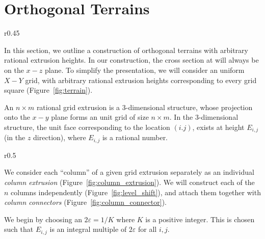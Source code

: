 \section{Orthogonal Terrains}
\label{sec:orthogonal_terrains}

\graphicspath{{./notebooks/}}%
\begin{wrapfigure}[7]{r}{0.45\textwidth}
    \vspace{-2.7em}
    \def\svgwidth{0.45\textwidth}
    
    \caption{Example orthogonal terrain.}
    \label{fig:terrain}
    \vspace{-1.2em}
\end{wrapfigure}
In this section, we outline a construction of orthogonal terrains with arbitrary rational extrusion heights.
In our construction, the cross section at will always be on the $x-z$ plane.
To simplify the presentation, we will consider an uniform $X-Y$ grid,
with arbitrary rational extrusion heights corresponding to every grid square (Figure~\ref{fig:terrain}).
\begin{definition}
An $n\times m$ rational grid extrusion is a 3-dimensional structure,
whose projection onto the $x-y$ plane forms an unit grid of size $n\times m$.
In the 3-dimensional structure, the unit face corresponding to the location $(i.j)$,
exists at height $E_{i,j}$ (in the $z$ direction), where $E_{i,j}$ is a rational number.
\end{definition}

\graphicspath{{./figures/}}
\begin{wrapfigure}[7]{r}{0.5\textwidth}
    \vspace{-2.5em}
    \def\svgwidth{0.5\textwidth}
    \caption{Column extrusion with heights $\left\{ 0,1,3,1,2,0\right\}$.}
    \label{fig:column_extrusion}
    \vspace{-0.8em}
\end{wrapfigure}
We consider each ``column'' of a given grid extrusion separately
as an individual \emph{column extrusion} (Figure~\ref{fig:column_extrusion}).
We will construct each of the $n$ columns independently (Figure~\ref{fig:level_shift}),
and attach them together with \emph{column connectors} (Figure~\ref{fig:column_connector}).

We begin by choosing an $2\varepsilon=1/K$ where $K$ is a positive integer.
This is chosen such that $E_{i,j}$ is an integral multiple of $2\varepsilon$ for all $i,j$.






%
%
